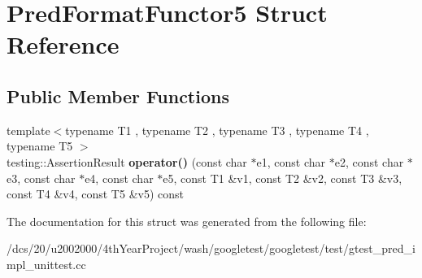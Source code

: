 \hypertarget{structPredFormatFunctor5}{}\section{Pred\+Format\+Functor5 Struct Reference}
\label{structPredFormatFunctor5}
\subsection*{Public Member Functions}
\begin{DoxyCompactItemize}
\item 
\mbox{\label{structPredFormatFunctor5_a0fe9e8e9ae614ea577cf1b34e9cfde58}} 
{\footnotesize template$<$typename T1 , typename T2 , typename T3 , typename T4 , typename T5 $>$ }\\testing\+::\+Assertion\+Result {\bfseries operator()} (const char $\ast$e1, const char $\ast$e2, const char $\ast$e3, const char $\ast$e4, const char $\ast$e5, const T1 \&v1, const T2 \&v2, const T3 \&v3, const T4 \&v4, const T5 \&v5) const
\end{DoxyCompactItemize}


The documentation for this struct was generated from the following file\+:\begin{DoxyCompactItemize}
\item 
/dcs/20/u2002000/4th\+Year\+Project/wash/googletest/googletest/test/gtest\+\_\+pred\+\_\+impl\+\_\+unittest.\+cc\end{DoxyCompactItemize}
